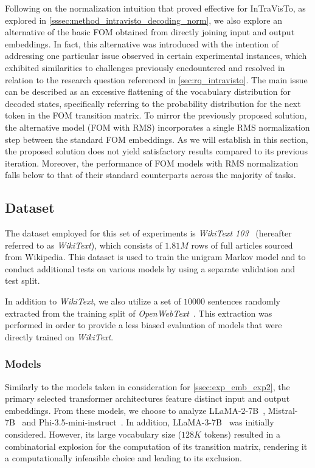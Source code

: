 Following on the normalization intuition that proved effective for InTraVisTo, as explored in \cref{sssec:method_intravisto_decoding_norm}, we also explore an alternative of the basic FOM obtained from directly joining input and output embeddings.
In fact, this alternative was introduced with the intention of addressing one particular issue observed in certain experimental instances, which exhibited similarities to challenges previously encdountered and resolved in relation to the research question referenced in \cref{sec:rq_intravisto}.
The main issue can be described as an excessive flattening of the vocabulary distribution for decoded states, specifically referring to the probability distribution for the next token in the FOM transition matrix.
To mirror the previously proposed solution, the alternative model (FOM with RMS) incorporates a single RMS normalization step between the standard FOM embeddings.
As we will establish in this section, the proposed solution does not yield satisfactory results compared to its previous iteration.
Moreover, the performance of FOM models with RMS normalization falls below to that of their standard counterparts across the majority of tasks.

\subsection{Dataset}\label{ssec:exp_fom_dataset}

The dataset employed for this set of experiments is \emph{WikiText 103}~\cite{merity2017} (hereafter referred to as \emph{WikiText}), which consists of $1.81M$ rows of full articles sourced from Wikipedia.
This dataset is used to train the unigram Markov model and to conduct additional tests on various models by using a separate validation and test split.

In addition to \emph{WikiText}, we also utilize a set of $10000$ sentences randomly extracted from the training split of \emph{OpenWebText}~\cite{gokaslan2019}.
This extraction was performed in order to provide a less biased evaluation of models that were directly trained on \emph{WikiText}.

\subsubsection{Models}

Similarly to the models taken in consideration for \cref{ssec:exp_emb_exp2}, the primary selected transformer architectures feature distinct input and output embeddings.
From these models, we choose to analyze LLaMA-2-7B~\cite{touvron2023}, Mistral-7B~\cite{jiang2023} and Phi-3.5-mini-instruct~\cite{abdin2024}.
In addition, LLaMA-3-7B~\cite{dubey2024} was initially considered.
However, its large vocabulary size ($128K$ tokens) resulted in a combinatorial explosion for the computation of its transition matrix, rendering it a computationally infeasible choice and leading to its exclusion.

